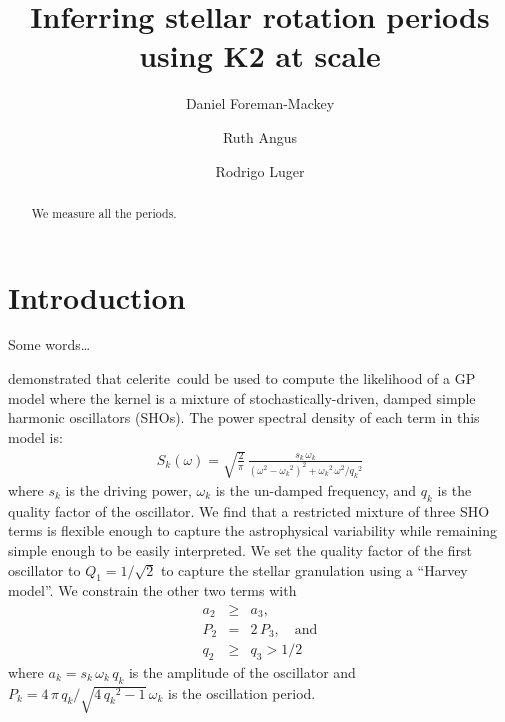 \documentclass[modern]{aastex61}
\newcommand{\project}[1]{\textsf{#1}}
\newcommand{\celerite}{\project{celerite}}
\begin{document}
\raggedbottom\sloppy\sloppypar\frenchspacing

\title{%
Inferring stellar rotation periods using K2 at scale
}

\author[0000-0002-9328-5652]{Daniel Foreman-Mackey}

\author[0000-0003-4540-5661]{Ruth Angus}

\author[0000-0002-0296-3826]{Rodrigo Luger}

\begin{abstract}

We measure all the periods.

\end{abstract}

\keywords{%
}

\section{Introduction}

Some words\ldots \citep{Luger:2017}

\citep{Foreman-Mackey:2017} demonstrated that \celerite\ could be used to
compute the likelihood of a GP model where the kernel is a mixture of
stochastically-driven, damped simple harmonic oscillators (SHOs).
The power spectral density of each term in this model is:
\begin{eqnarray}
S_k(\omega) = \sqrt{\frac{2}{\pi}}\,
\frac{s_k\,\omega_k}{{(\omega^2 - {\omega_k}^2)}^2 +
    {\omega_k}^2\,\omega^2/{q_k}^2}
\end{eqnarray}
where $s_k$ is the driving power, $\omega_k$ is the un-damped frequency, and
$q_k$ is the quality factor of the oscillator.
We find that a restricted mixture of three SHO terms is flexible enough to
capture the astrophysical variability while remaining simple enough to be
easily interpreted.
We set the quality factor of the first oscillator to $Q_1 = 1/\sqrt{2}$ to
capture the stellar granulation using a ``Harvey model''.
We constrain the other two terms with
\begin{eqnarray}
a_2 &\ge& a_3, \\
P_2 &=& 2\,P_3,\quad \mathrm{and} \\
q_2 &\ge& q_3 > 1/2
\end{eqnarray}
where $a_k = s_k\,\omega_k\,q_k$ is the amplitude of the oscillator and
$P_k = 4\,\pi\,q_k / \sqrt{4\,{q_k}^2-1}\,\omega_k$ is the oscillation period.
\end{document}
